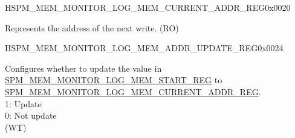 \begin{register}{H}{SPM\_MEM\_MONITOR\_LOG\_MEM\_CURRENT\_ADDR\_REG}{0x0020}\label{regdesc:SPMMEMMONITORLOGMEMCURRENTADDRREG}
%
\regnewline%
\begin{regdesc}\begin{reglist}
\label{fielddesc:SPMMEMMONITORLOGMEMCURRENTADDR}\item [SPM\_MEM\_MONITOR\_LOG\_MEM\_CURRENT\_ADDR] Represents the address of the next write. (RO)
\end{reglist}\end{regdesc}
\end{register}

\begin{register}{H}{SPM\_MEM\_MONITOR\_LOG\_MEM\_ADDR\_UPDATE\_REG}{0x0024}\label{regdesc:SPMMEMMONITORLOGMEMADDRUPDATEREG}
%
%
\regnewline%
\begin{regdesc}\begin{reglist}
\label{fielddesc:SPMMEMMONITORCLRLOGMEMADDRUPDATE}\item [SPM\_MEM\_MONITOR\_LOG\_MEM\_ADDR\_UPDATE] Configures whether to update the value in \hyperref[fielddesc:SPMMEMMONITORLOGMEMSTART]{SPM\_MEM\_MONITOR\_LOG\_MEM\_START\_REG} to \hyperref[fielddesc:SPMMEMMONITORLOGMEMCURRENTADDR]{SPM\_MEM\_MONITOR\_LOG\_MEM\_CURRENT\_ADDR\_REG}.\\
1: Update\\
0: Not update\\

(WT)
\end{reglist}\end{regdesc}
\end{register}

